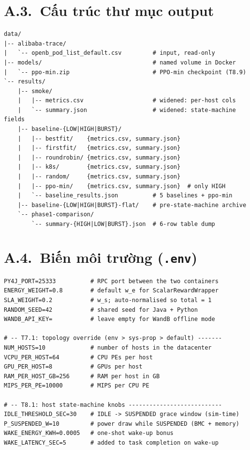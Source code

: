 \begin{appendices}
\section*{A.3.\ Cấu trúc thư mục output}

\begin{lstlisting}[style=yamlstyle, caption={Layout of generated data (Phase 1.8).}]
data/
|-- alibaba-trace/
|   `-- openb_pod_list_default.csv         # input, read-only
|-- models/                                # named volume in Docker
|   `-- ppo-min.zip                        # PPO-min checkpoint (T8.9)
`-- results/
    |-- smoke/
    |   |-- metrics.csv                    # widened: per-host cols
    |   `-- summary.json                   # widened: state-machine fields
    |-- baseline-{LOW|HIGH|BURST}/
    |   |-- bestfit/    {metrics.csv, summary.json}
    |   |-- firstfit/   {metrics.csv, summary.json}
    |   |-- roundrobin/ {metrics.csv, summary.json}
    |   |-- k8s/        {metrics.csv, summary.json}
    |   |-- random/     {metrics.csv, summary.json}
    |   |-- ppo-min/    {metrics.csv, summary.json}  # only HIGH
    |   `-- baseline_results.json          # 5 baselines + ppo-min
    |-- baseline-{LOW|HIGH|BURST}-flat/    # pre-state-machine archive
    `-- phase1-comparison/
        `-- summary-{HIGH|LOW|BURST}.json  # 6-row table dump
\end{lstlisting}

\section*{A.4.\ Biến môi trường (\texttt{.env})}

\begin{lstlisting}[style=yamlstyle]
PY4J_PORT=25333          # RPC port between the two containers
ENERGY_WEIGHT=0.8        # default w_e for ScalarRewardWrapper
SLA_WEIGHT=0.2           # w_s; auto-normalised so total = 1
RANDOM_SEED=42           # shared seed for Java + Python
WANDB_API_KEY=           # leave empty for WandB offline mode

# -- T7.1: topology override (env > sys-prop > default) -------
NUM_HOSTS=10             # number of hosts in the datacenter
VCPU_PER_HOST=64         # CPU PEs per host
GPU_PER_HOST=8           # GPUs per host
RAM_PER_HOST_GB=256      # RAM per host in GB
MIPS_PER_PE=10000        # MIPS per CPU PE

# -- T8.1: host state-machine knobs ---------------------------
IDLE_THRESHOLD_SEC=30    # IDLE -> SUSPENDED grace window (sim-time)
P_SUSPENDED_W=10         # power draw while SUSPENDED (BMC + memory)
WAKE_ENERGY_KWH=0.0005   # one-shot wake-up bonus
WAKE_LATENCY_SEC=5       # added to task completion on wake-up


\end{lstlisting}
\end{appendices}
